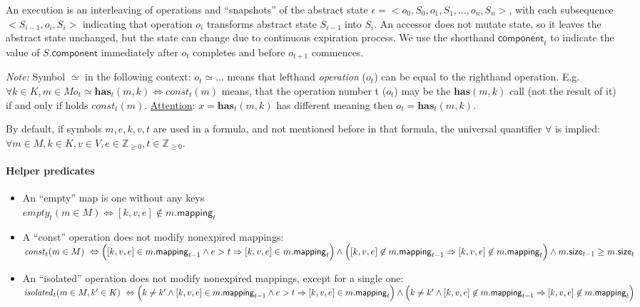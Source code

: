 \documentclass{article}
\renewcommand{\o}[1]{\ensuremath{\mathbf{#1}}}
\newcommand{\p}[1]{\ensuremath{\mathit{#1}}}
\newcommand{\s}[1]{\ensuremath{\mathsf{#1}}}
\newcommand{\nintset}{\ensuremath{\mathds{Z}_{\ge 0}}}
\begin{document}
An execution is an interleaving of operations and ``snapshots'' of the abstract state
$\epsilon = <o_0, S_0, o_1, S_1, ..., o_n, S_n>$, with
each subsequence $<S_{i-1}, o_i, S_i>$ indicating that operation $o_i$ transforms abstract state $S_{i-1}$ into $S_i$.
An accessor does not mutate state, so it leaves the abstract state unchanged, but the state can change due to continuous expiration process.
We use the shorthand $\s{component}_t$ to indicate the value of $S.$\s{component} immediately after $o_t$ completes and before $o_{t+1}$ commences.

{\it Note:} Symbol $\simeq$ in the following context: $o_t\simeq ...$ means that lefthand {\it operation} ($o_t$) can be equal to the righthand operation. E.g. $\forall k \in K, m \in M o_t\simeq \o{has}_t(m, k) \Leftrightarrow \p{const}_t(m)$ means, that the operation number t ($o_t$) may be the $\o{has}(m, k)$ call (not the result of it) if and only if holds $\p{const}_t(m)$. \underline{Attention}: $x=\o{has}_t(m, k)$ has different meaning then $o_t=\o{has}_t(m, k)$.

By default, if symbols $m, e, k, v, t$ are used in a formula, and not mentioned before in that formula, the universal quantifier $\forall$ is implied: $\forall m\in M, k \in K, v\in V, e\in \nintset, t\in \nintset$.

\paragraph{Helper predicates}
\begin{itemize}
\item An ``empty'' map is one without any keys \\
  $\p{empty}_t(m\in M) \Leftrightarrow [k, v, e] \not\in m.\s{mapping}_t$
\item A ``const'' operation does not modify nonexpired mappings:\\
  $\p{const}_t(m\in M) ~\Leftrightarrow~\\ \Big([k, v, e] \in m.\s{mapping}_{t-1} \wedge e>t \Rightarrow [k, v, e] \in m.\s{mapping}_t\Big)\wedge\\ \Big([k, v, e] \not\in m.\s{mapping}_{t-1} \Rightarrow [k, v, e] \not\in m.\s{mapping}_t\Big)\wedge m.\s{size}_{t-1} \ge m.\s{size}_t$
\item An ``isolated'' operation does not modify nonexpired mappings, except for a single one:\\
  $\p{isolated}_t(m\in M, k'\in K) ~\Leftrightarrow~\\ \Big(k\neq k' \wedge [k, v, e] \in m.\s{mapping}_{t-1} \wedge e>t \Rightarrow [k, v, e] \in m.\s{mapping}_t\Big)\wedge\\ \Big(k\neq k' \wedge [k, v, e] \not\in m.\s{mapping}_{t-1} \Rightarrow [k, v, e] \not\in m.\s{mapping}_t\Big)$
\end{itemize}
\end{document}
